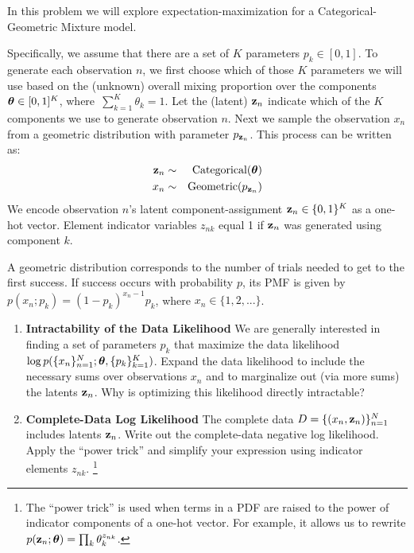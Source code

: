 \documentclass[submit]{harvardml}
\begin{document}
\begin{problem}

In this problem we will explore expectation-maximization for a
Categorical-Geometric Mixture model.

Specifically, we assume that there are a set of $K$ parameters $p_k
\in [0,1]$.  To generate each observation $n$, we first choose which
of those $K$ parameters we will use based on the (unknown) overall
mixing proportion over the components $\boldsymbol{\theta} \in [0,1]^K$,
where~${\sum_{k=1}^K \theta_k=1}$.  Let the (latent) $\mathbf{z}_n$ indicate
which of the $K$ components we use to generate observation $n$.  Next
we sample the observation $x_n$ from a geometric distribution
with parameter $p_{\mathbf{z}_n}$.  This process can be written as: 
\begin{eqnarray*}
 \mathbf{z}_n &\sim& \text{Categorical}(\boldsymbol{\theta}) \\
 x_n &\sim& \text{Geometric}(p_{\mathbf{z}_n} )
\end{eqnarray*}
We encode observation $n$'s latent
component-assignment ${\mathbf{z}_n \in
  \{0,1\}^K}$ as a one-hot vector. Element indicator variables $z_{n k}$ equal 1 if $\mathbf{z}_n$ was generated using component $k$.

A geometric distribution corresponds to the number of trials
needed to get to the first success. If success occurs with probability
$p$, its PMF is given by $p(x_n ; p_k) = (1 - p_k)^{x_n - 1} p_k$, where $x_n \in \{1, 2, ...\}$.

  \begin{enumerate}

  \item \textbf{Intractability of the Data Likelihood} We are
    generally interested in finding a set of parameters $p_k$ that
    maximize the data likelihood $\log
    p(\{x_n\}^N_{n=1}; \boldsymbol{\theta}, \{p_k\}^K_{k = 1})$.  Expand the data
    likelihood to include the necessary sums over observations
    $x_n$ and to marginalize out (via more sums) the latents
    $\mathbf{z}_n$.  Why is optimizing this likelihood directly
    intractable?  

\item \textbf{Complete-Data Log Likelihood} The complete data
  $D = \{(x_n, \mathbf{z}_n)\}_{n=1}^N$ includes latents $\mathbf{z}_n$. Write
  out the complete-data negative log likelihood. Apply the ``power
  trick''  and simplify your expression using indicator elements $z_{n
    k}$. \footnote{The ``power trick'' is used when terms in a PDF are raised to the power of indicator components of a one-hot vector.  For example, it allows us to rewrite $p(\mathbf{z}_n ;  \boldsymbol{\theta}) = \prod_k \theta_k^{z_{nk}}$.}


\end{enumerate}
\end{problem}
\end{document}
